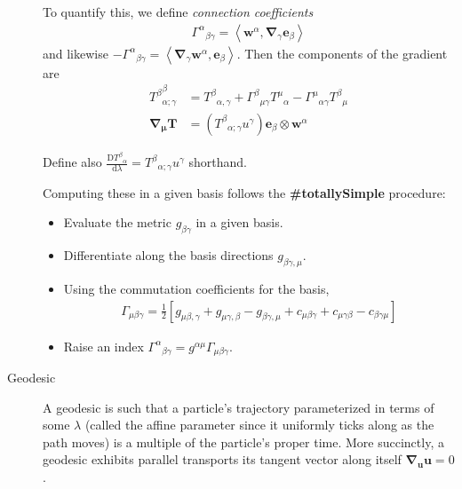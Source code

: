 \documentclass[12pt]{report}
\newcommand{\bm}[1]{\boldsymbol{\mathbf{#1}}}
\newcommand{\expvalue}[1]{\left<#1\right>}
\begin{document}
\begin{description}
        To quantify this, we define \emph{connection coefficients}
        \begin{align}
            {\Gamma^{\alpha}}_{\beta\gamma} = \expvalue{\bm{w}^\alpha,
            \bm{\nabla}_{\gamma}\bm{e}_\beta}
        \end{align}
        and likewise
        $-{\Gamma^{\alpha}}_{\beta\gamma} = \expvalue{\bm{\nabla}_{\gamma}
        \bm{w}^\alpha, \bm{e}_\beta}$. Then the components of the gradient are
        \begin{align}
            {T^{\beta}}^\beta_{\alpha;\gamma} &=
                {T^\beta}_{\alpha,\gamma} +
                {\Gamma^\beta}_{\mu\gamma}{T^{\mu}}_\alpha -
                {\Gamma^\mu}_{\alpha\gamma}{T^{\beta}}_\mu\\
            \bm{\nabla}_{\bm{\mu}}\bm{T} &=
                \left( {T^\beta}_{\alpha;\gamma}u^\gamma \right)
                \bm{e}_\beta \otimes \bm{w}^\alpha
        \end{align}

        Define also $\frac{\mathrm{D}{T^\beta}_\alpha}{\mathrm{d}\lambda} =
        {T^\beta}_{\alpha;\gamma}u^\gamma$ shorthand.

        Computing these in a given basis follows the \textbf{\#totallySimple}
        procedure:
        \begin{itemize}
            \item Evaluate the metric $g_{\beta\gamma}$ in a given basis.
            \item Differentiate along the basis directions
                $g_{\beta\gamma,\mu}$.
            \item Using the commutation coefficients for the basis,
                \begin{align}
                    \Gamma_{\mu\beta\gamma} = \frac{1}{2}\left[
                        g_{\mu\beta,\gamma} + g_{\mu\gamma, \beta} -
                        g_{\beta\gamma, \mu} +
                        c_{\mu\beta\gamma} + c_{\mu\gamma\beta} -
                        c_{\beta\gamma\mu}
                    \right]
                \end{align}
            \item Raise an index ${\Gamma^\alpha}_{\beta\gamma} = g^{\alpha\mu}
                \Gamma_{\mu\beta\gamma}$.
        \end{itemize}

    \item[Geodesic] A geodesic is such that a particle's trajectory
        parameterized in terms of some $\lambda$ (called the affine parameter
        since it uniformly ticks along as the path moves) is a multiple of the
        particle's proper time. More succinctly, a geodesic exhibits parallel
        transports its tangent vector along itself $\bm{\nabla}_{\bm{u}}\bm{u} =
        0$.


\end{description}
\end{document}
